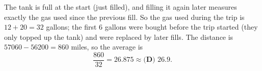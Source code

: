 The tank is full at the start (just filled), and filling it again later measures exactly the gas used since the previous fill. So the gas used during the trip is $12+20=32$ gallons; the first $6$ gallons were bought before the trip started (they only topped up the tank) and were replaced by later fills. The distance is $57060-56200=860$ miles, so the average is
\[\dfrac{860}{32}=26.875\approx\boxed{\textbf{(D) } 26.9}.\]
